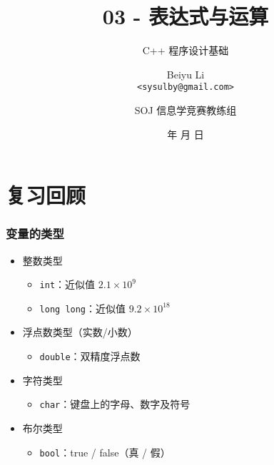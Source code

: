 \title[03 - 表达式与运算]
{03 - 表达式与运算}

\subtitle{C++ 程序设计基础}

\author[Beiyu Li]
{Beiyu Li\\
\texttt{<sysulby@gmail.com>}}


\date[\today]
{\number\year 年 \number\month 月 \number\day 日}




\author[sysulby]
{SOJ 信息学竞赛教练组}

\begin{frame}
    \titlepage
\end{frame}
\setcounter{framenumber}{0} %


\section{复习回顾}

\begin{frame}[fragile]
    \frametitle{变量的类型}

    \begin{itemize}
        \item<1-> 整数类型

            \begin{itemize}
                \item \lstinline|int|：近似值 $2.1 \times 10^9$
                \item \lstinline|long long|：近似值 $9.2 \times 10^{18}$
            \end{itemize}

        \item<2-> 浮点数类型（实数/小数）

            \begin{itemize}
                \item \lstinline|double|：双精度浮点数
            \end{itemize}

        \item<3-> 字符类型

            \begin{itemize}
                \item \lstinline|char|：键盘上的字母、数字及符号
            \end{itemize}

        \item<4-> 布尔类型

            \begin{itemize}
                \item \lstinline|bool|：true / false（真 / 假）
            \end{itemize}

    \end{itemize}
\end{frame}

